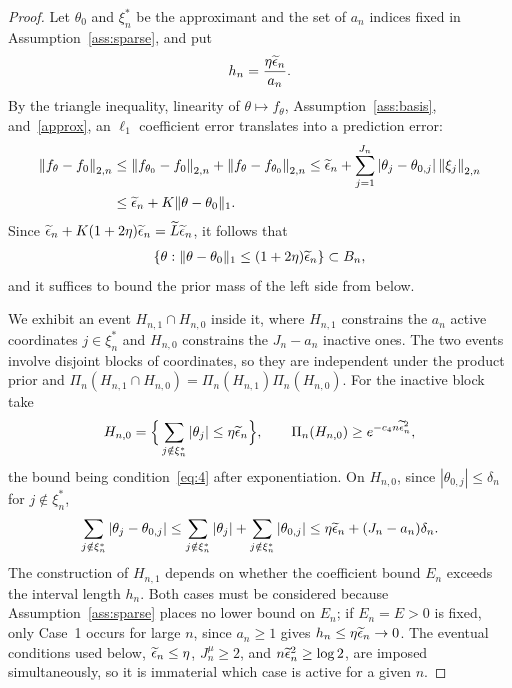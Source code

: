 \begin{proof}
Let $\theta_0$ and $\xi_n^*$ be the approximant and the set of $a_n$ indices fixed in Assumption~\ref{ass:sparse}, and put
\begin{align*}
h_n=\frac{\eta\widetilde{\epsilon}_n}{a_n}.
\end{align*}
By the triangle inequality, linearity of $\theta\mapsto f_\theta$, Assumption~\ref{ass:basis}, and~\eqref{approx}, an $\ell_1$ coefficient error translates into a prediction error:
\begin{align}
\left\lVert f_\theta-f_0 \right\rVert_{2,n}
&\leq\left\lVert f_{\theta_0}-f_0 \right\rVert_{2,n}+\left\lVert f_\theta-f_{\theta_0} \right\rVert_{2,n}
\leq\widetilde{\epsilon}_n+\sum_{j=1}^{J_n}|\theta_j-\theta_{0,j}|\left\lVert \xi_j \right\rVert_{2,n}\notag\\
&\leq\widetilde{\epsilon}_n+K\|\theta-\theta_0\|_1 .
\label{eq:coefficient-ball}
\end{align}
Since $\widetilde{\epsilon}_n+K(1+2\eta)\widetilde{\epsilon}_n=\widetilde L\widetilde{\epsilon}_n$, it follows that
\begin{align}
\{\theta:\|\theta-\theta_0\|_1\leq(1+2\eta)\widetilde{\epsilon}_n\}\subset B_n,
\label{eq:l1-in-Bn}
\end{align}
and it suffices to bound the prior mass of the left side from below.

We exhibit an event $H_{n,1}\cap H_{n,0}$ inside it, where $H_{n,1}$ constrains the $a_n$ active coordinates $j\in\xi_n^*$ and $H_{n,0}$ constrains the $J_n-a_n$ inactive ones. The two events involve disjoint blocks of coordinates, so they are independent under the product prior and $\Pi_n(H_{n,1}\cap H_{n,0})=\Pi_n(H_{n,1})\Pi_n(H_{n,0})$. For the inactive block take
\begin{align*}
H_{n,0}=\Big\{\sum_{j\notin\xi_n^*}|\theta_j|\leq\eta\widetilde{\epsilon}_n\Big\},
\qquad
\Pi_n(H_{n,0})\geq e^{-c_4n\widetilde{\epsilon}_n^2},
\end{align*}
the bound being condition~\eqref{eq:4} after exponentiation. On $H_{n,0}$, since $|\theta_{0,j}|\leq\delta_n$ for $j\notin\xi_n^*$,
\begin{align}
\sum_{j\notin\xi_n^*}|\theta_j-\theta_{0,j}|
\leq\sum_{j\notin\xi_n^*}|\theta_j|+\sum_{j\notin\xi_n^*}|\theta_{0,j}|
\leq\eta\widetilde{\epsilon}_n+(J_n-a_n)\delta_n .
\label{eq:inactive-block}
\end{align}
The construction of $H_{n,1}$ depends on whether the coefficient bound $E_n$ exceeds the interval length $h_n$. Both cases must be considered because Assumption~\ref{ass:sparse} places no lower bound on $E_n$; if $E_n=E>0$ is fixed, only Case~1 occurs for large $n$, since $a_n\geq1$ gives $h_n\leq\eta\widetilde{\epsilon}_n\to0$. The eventual conditions used below, $\widetilde{\epsilon}_n\leq\eta$, $J_n^\mu\geq2$, and $n\widetilde{\epsilon}_n^2\geq\log2$, are imposed simultaneously, so it is immaterial which case is active for a given $n$.


\end{proof}
